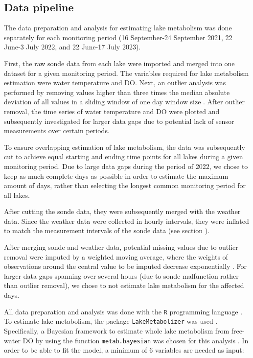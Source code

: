 \documentclass[11pt,lineno]{manuscript}\usepackage[]{graphicx}\usepackage[]{xcolor}
\begin{document}
\subsection{Data pipeline} \label{subsec:pipeline}

The data preparation and analysis for estimating lake metabolism was done separately for each monitoring
period (16 September-24 September 2021, 22 June-3 July 2022, and 22 June-17 July 2023).

First, the raw sonde data from each lake were imported and merged into
one dataset for a given monitoring period. The variables required for lake metabolism
estimation were water temperature and
DO. Next, an outlier analysis was performed by removing
values higher than three times the median absolute deviation of all values in a
sliding window of one day window size \citep{Luerig:2021}.
After outlier removal, the time series of water temperature and DO
were plotted and subsequently investigated for larger data gaps due to potential lack of sensor
measurements over certain periods.

To ensure overlapping estimation of lake metabolism, the data was subsequently
cut to achieve equal starting and ending time points for all lakes during a given
monitoring period. Due to large data gaps during the period of 2022, we chose
to keep as much complete days as possible in order to estimate the maximum
amount of days, rather than selecting the longest common monitoring period
for all lakes.

After cutting the sonde data, they were subsequently merged with the weather data.
Since the weather data were collected in hourly intervals, they were inflated to match
the measurement intervals of the sonde data (see section ).

After merging sonde and weather data, potential missing values due to outlier removal
were imputed by a weighted moving average, where the weights of observations around the
central value to be imputed decrease exponentially \citep{Moritz:2017}.
For larger data gaps spanning over several hours (due to sonde malfunction rather
than outlier removal), we chose
to not estimate lake metabolism for the affected days.\smallskip

All data preparation and analysis was done with the \texttt{R} programming language \citep{R}.
To estimate lake metabolism, the package \texttt{LakeMetabolizer} was used \citep{Winslow:2016}.
Specifically, a Bayesian framework to estimate whole lake metabolism from free-water
DO by using the function \texttt{metab.bayesian} was chosen for
this analysis \citep{Holtgrieve:2010}.
In order to be able to fit the model, a minimum of 6 variables are needed as input:
\end{document}
